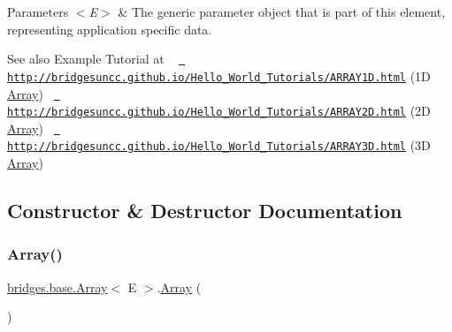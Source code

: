 \begin{DoxyParams}{Parameters}
{\em $<$\+E$>$} & The generic parameter object that is part of this element, representing application specific data.\\
\hline
\end{DoxyParams}
\begin{DoxySeeAlso}{See also}
Example Tutorial at ~\newline
 \href{http://bridgesuncc.github.io/Hello_World_Tutorials/ARRAY1D.html}{\texttt{ http\+://bridgesuncc.\+github.\+io/\+Hello\+\_\+\+World\+\_\+\+Tutorials/\+A\+R\+R\+A\+Y1\+D.\+html}} (1D \mbox{\hyperlink{classbridges_1_1base_1_1_array}{Array}})~\newline
 \href{http://bridgesuncc.github.io/Hello_World_Tutorials/ARRAY2D.html}{\texttt{ http\+://bridgesuncc.\+github.\+io/\+Hello\+\_\+\+World\+\_\+\+Tutorials/\+A\+R\+R\+A\+Y2\+D.\+html}} (2D \mbox{\hyperlink{classbridges_1_1base_1_1_array}{Array}})~\newline
 \href{http://bridgesuncc.github.io/Hello_World_Tutorials/ARRAY3D.html}{\texttt{ http\+://bridgesuncc.\+github.\+io/\+Hello\+\_\+\+World\+\_\+\+Tutorials/\+A\+R\+R\+A\+Y3\+D.\+html}} (3D \mbox{\hyperlink{classbridges_1_1base_1_1_array}{Array}}) 
\end{DoxySeeAlso}


\subsection{Constructor \& Destructor Documentation}
\mbox{\label{classbridges_1_1base_1_1_array_ad5dbf7bbd9811c2dac16a5c135465d4b}} 
\subsubsection{\texorpdfstring{Array()}{Array()}\hspace{0.1cm}{\footnotesize\ttfamily [1/5]}}
{\footnotesize\ttfamily \mbox{\hyperlink{classbridges_1_1base_1_1_array}{bridges.\+base.\+Array}}$<$ E $>$.\mbox{\hyperlink{classbridges_1_1base_1_1_array}{Array}} (\begin{DoxyParamCaption}{ }\end{DoxyParamCaption})}

\mbox{\label{classbridges_1_1base_1_1_array_ab37dbe6efe0c34242456971e430763f7}} 
